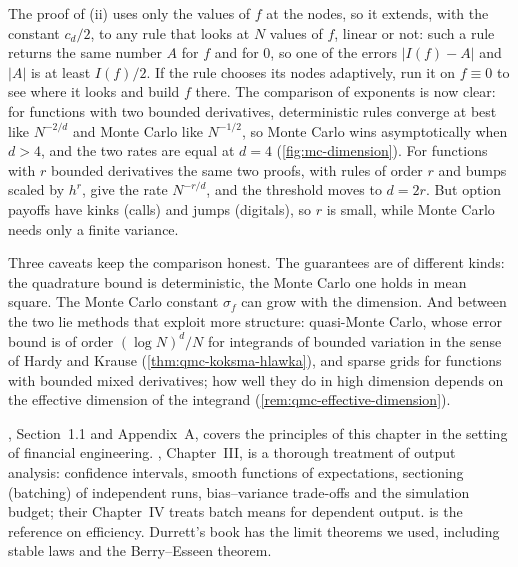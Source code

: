 The proof of (ii) uses only the values of $f$ at the nodes, so it extends, with the constant
$c_d/2$, to any rule that looks at $N$ values of $f$, linear or not: such a rule returns the
same number $A$ for $f$ and for $0$, so one of the errors $|I(f)-A|$ and $|A|$ is at least
$I(f)/2$. If the rule chooses its nodes adaptively, run it on $f\equiv0$ to see where it
looks and build $f$ there. The comparison of
exponents is now clear: for functions with two bounded derivatives, deterministic rules
converge at best like $N^{-2/d}$ and Monte Carlo like $N^{-1/2}$, so Monte Carlo wins
asymptotically when $d>4$, and the two rates are equal at $d=4$ (\cref{fig:mc-dimension}). For functions with $r$
bounded derivatives the same two proofs, with rules of order $r$ and bumps scaled by $h^r$,
give the rate $N^{-r/d}$, and the threshold moves to $d=2r$. But option payoffs have kinks
(calls) and jumps (digitals), so $r$ is small, while Monte Carlo needs only a finite
variance.

Three caveats keep the comparison honest. The guarantees are of different kinds: the
quadrature bound is deterministic, the Monte Carlo one holds in mean square. The Monte Carlo
constant $\sigma_f$ can grow with the dimension. And between the two lie methods that
exploit more structure: quasi-Monte Carlo, whose error bound is of order $(\log N)^d/N$
for integrands of bounded variation in the sense of Hardy and Krause
(\cref{thm:qmc-koksma-hlawka}), and sparse grids \citep{bungartz-griebel}
for functions with bounded mixed derivatives; how well they do in high dimension depends on
the effective dimension of the integrand (\cref{rem:qmc-effective-dimension}).


\furtherreading
\textcite{glasserman-mc}, Section~1.1 and Appendix~A, covers the principles of this chapter
in the setting of financial engineering. \textcite{asmussen-glynn}, Chapter~III, is a
thorough treatment of output analysis: confidence intervals, smooth functions of
expectations, sectioning (batching) of independent runs, bias--variance trade-offs and the
simulation budget; their Chapter~IV treats batch means for dependent output.
\textcite{glynn-whitt} is the reference on efficiency. Durrett's book \citep{durrett} has the
limit theorems we used, including stable laws and the Berry--Esseen theorem.
